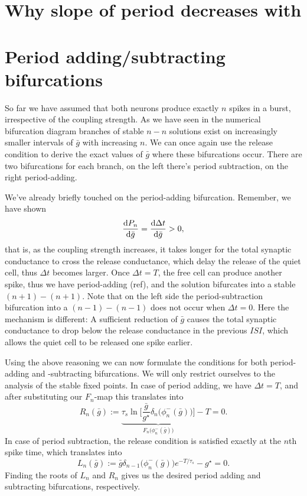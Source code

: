 \documentclass[12pt,authoryear]{elsarticle}
\newcommand{\gstar}{g^\star}
\newcommand{\gbar}{\bar g}
\newcommand{\delt}{\Delta t}
\newcommand{\taus}{\tau_s}
\begin{document}
\section*{Why slope of period decreases with }



\section*{Period adding/subtracting bifurcations}
So far we have assumed that both neurons produce exactly $n$ spikes in a burst, irrespective of the coupling strength.
As we have seen in the numerical bifurcation diagram branches of stable $n-n$ solutions exist on increasingly smaller intervals of $\gbar$ with increasing $n$.
We can once again use the release condition to derive the exact values of $\gbar$ where these bifurcations occur.
There are two bifurcations for each branch, on the left there's period subtraction, on the right period-adding.

We've already briefly touched on the period-adding bifurcation.
Remember, we have shown
\begin{equation}
  \dv{P_{n}}{\gbar}=\dv{\delt}{\gbar}>0,
\end{equation}
that is, as the coupling strength increases, it takes longer for the total synaptic conductance to cross the release conductance, which delay the release of the quiet cell, thus $\delt$ becomes larger.
Once $\delt=T$, the free cell can produce another spike, thus we have period-adding (ref), and the solution bifurcates into a stable $(n+1)-(n+1)$.
Note that on the left side the period-subtraction bifurcation into a $(n-1)-(n-1)$ does not occur when $\delt=0$.
Here the mechanism is different: A sufficient reduction of $\gbar$ causes the total synaptic conductance to drop below the release conductance in the previous $ISI$, which allows the quiet cell to be released one spike earlier.

Using the above reasoning we can now formulate the conditions for both period-adding and -subtracting bifurcations.
We will only restrict ourselves to the analysis of the stable fixed points.
In case of period adding, we have $\delt=T$, and after substituting our $F_{n}$-map this translates into
\begin{equation}
   R_{n}(\gbar):=\underbrace{\taus \ln\big[\frac{\gbar}{\gstar}\delta_{n}\big(\phi_{n}^{-}(\gbar)\big)\big]}_{F_{n}\big(\phi_{n}^{-}(\gbar)\big)} -T =0.
\end{equation}
In case of period subtraction, the release condition is satisfied exactly at the $n$th spike time, which translates into
\begin{equation}
  L_{n}(\gbar):=\gbar \delta_{n-1}\big(\phi_{n}^{-}(\gbar)\big)e^{-T/\taus} -\gstar = 0.
\end{equation}
Finding the roots of $L_{n}$ and $R_{n}$ gives us the desired period adding and subtracting bifurcations, respectively.
\end{document}
